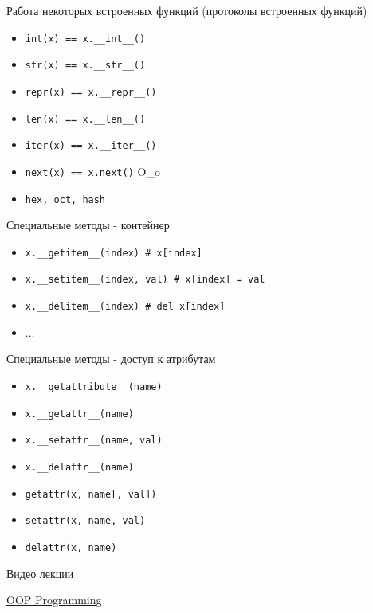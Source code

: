 \documentclass{article}
\begin{document}
\begin{center} Работа некоторых встроенных функций (протоколы встроенных функций) \end{center}
\begin{itemize}
    \item \lstinline!int(x) == x.__int__()!
    \item \lstinline!str(x) == x.__str__()!
    \item \lstinline!repr(x) == x.__repr__()!
    \item \lstinline!len(x) == x.__len__()!
    \item \lstinline!iter(x) == x.__iter__()!
    \item \lstinline!next(x) == x.next()! O\_o
    \item \lstinline!hex, oct, hash!
\end{itemize}
\newpage

\begin{center} Специальные методы - контейнер \end{center}
\begin{itemize}
    \item \lstinline!x.__getitem__(index) # x[index]!
    \item \lstinline!x.__setitem__(index, val) # x[index] = val!
    \item \lstinline!x.__delitem__(index) # del x[index]!
    \item ...
\end{itemize}
\newpage

\begin{center} Специальные методы - доступ к атрибутам \end{center}
\begin{itemize}
    \item \lstinline!x.__getattribute__(name)!
    \item \lstinline!x.__getattr__(name)!
    \item \lstinline!x.__setattr__(name, val)!
    \item \lstinline!x.__delattr__(name)!
    \item \lstinline!getattr(x, name[, val])!
    \item \lstinline!setattr(x, name, val)!
    \item \lstinline!delattr(x, name)!
\end{itemize}
\newpage

\begin{center} Видео лекции \end{center}
	\href{http://www.youtube.com/watch?v=rDXuPBjVfSc&feature=related}{OOP Programming}
\newpage
\end{document}
